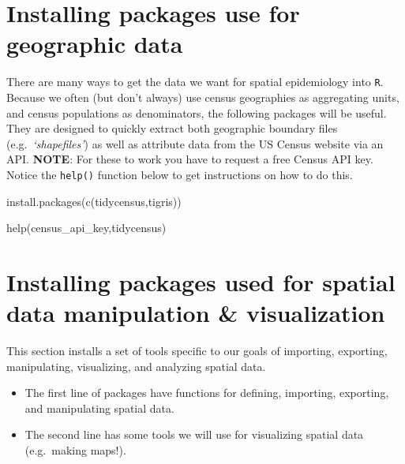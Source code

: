 \documentclass[
]{book}
\newenvironment{Shaded}{\begin{snugshade}}{\end{snugshade}}
\newcommand{\FunctionTok}[1]{\textcolor[rgb]{0.00,0.00,0.00}{#1}}
\newcommand{\NormalTok}[1]{#1}
\newcommand{\StringTok}[1]{\textcolor[rgb]{0.31,0.60,0.02}{#1}}
\providecommand{\tightlist}{%
  \setlength{\itemsep}{0pt}\setlength{\parskip}{0pt}}
\begin{document}
\hypertarget{installing-packages-use-for-geographic-data}{%
\section*{Installing packages use for geographic data}\label{installing-packages-use-for-geographic-data}}

There are many ways to get the data we want for spatial epidemiology into \texttt{R}. Because we often (but don't always) use census geographies as aggregating units, and census populations as denominators, the following packages will be useful. They are designed to quickly extract both geographic boundary files (e.g.~\emph{`shapefiles'}) as well as attribute data from the US Census website via an API. \textbf{NOTE}: For these to work you have to request a free Census API key. Notice the \texttt{help()} function below to get instructions on how to do this.

\begin{Shaded}
\begin{Highlighting}[]
\FunctionTok{install.packages}\NormalTok{(}\FunctionTok{c}\NormalTok{(}\StringTok{\textquotesingle{}tidycensus\textquotesingle{}}\NormalTok{,}\StringTok{\textquotesingle{}tigris\textquotesingle{}}\NormalTok{)) }

\FunctionTok{help}\NormalTok{(}\StringTok{\textquotesingle{}census\_api\_key\textquotesingle{}}\NormalTok{,}\StringTok{\textquotesingle{}tidycensus\textquotesingle{}}\NormalTok{)}
\end{Highlighting}
\end{Shaded}

\hypertarget{installing-packages-used-for-spatial-data-manipulation-visualization}{%
\section*{Installing packages used for spatial data manipulation \& visualization}\label{installing-packages-used-for-spatial-data-manipulation-visualization}}

This section installs a set of tools specific to our goals of importing, exporting, manipulating, visualizing, and analyzing spatial data.

\begin{itemize}
\tightlist
\item
  The first line of packages have functions for defining, importing, exporting, and manipulating spatial data.
\item
  The second line has some tools we will use for visualizing spatial data (e.g.~making maps!).
\end{itemize}
\end{document}
